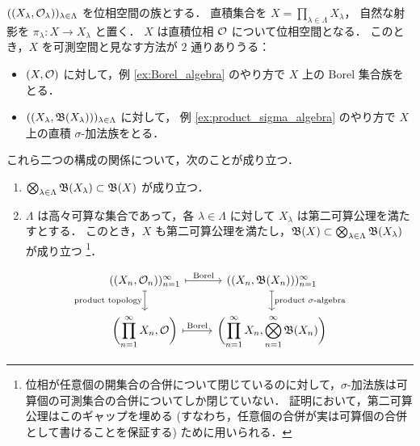 \begin{proposition}\label{prop:product_compatibility}
    $((X_\lambda,\mathcal{O}_\lambda))_{\lambda\in\Lambda}$ を位相空間の族とする．
    直積集合を $X=\prod_{\lambda\in\Lambda}X_\lambda$，
    自然な射影を $\pi_\lambda:X\to X_\lambda$ と置く．
    $X$ は直積位相 $\mathcal{O}$ について位相空間となる．
    このとき，$X$ を可測空間と見なす方法が $2$ 通りありうる：
    \begin{itemize}
        \item $(X,\mathcal{O})$ に対して，例 \ref{ex:Borel_algebra} のやり方で $X$ 上の Borel 集合族をとる．
        \item $((X_\lambda,\mathfrak{B}(X_\lambda)))_{\lambda\in\Lambda}$ に対して，
            例 \ref{ex:product_sigma_algebra} のやり方で $X$ 上の直積 $\sigma$-加法族をとる．
    \end{itemize}
    これら二つの構成の関係について，次のことが成り立つ．
    \begin{enumerate}
        \item $\bigotimes_{\lambda\in\Lambda}\mathfrak{B}(X_\lambda)\subset\mathfrak{B}(X)$ が成り立つ．
        \item $\Lambda$ は高々可算な集合であって，各 $\lambda\in\Lambda$ に対して $X_\lambda$ は第二可算公理を満たすとする．
            このとき，$X$ も第二可算公理を満たし，$\mathfrak{B}(X)\subset\bigotimes_{\lambda\in\Lambda}\mathfrak{B}(X_\lambda)$ が成り立つ
            \footnote{
                位相が任意個の開集合の合併について閉じているのに対して，$\sigma$-加法族は可算個の可測集合の合併についてしか閉じていない．
                証明において，第二可算公理はこのギャップを埋める (すなわち，任意個の合併が実は可算個の合併として書けることを保証する) ために用いられる．
            }．
    \end{enumerate}
    \begin{equation*}
        \begin{tikzcd}
            ((X_n,\Ocal_n))_{n=1}^\infty\arrow[r,mapsto,"\text{Borel}"]\arrow[d,mapsto,"\text{product topology}"']&
            ((X_n,\Bfrak(X_n)))_{n=1}^\infty\arrow[d,mapsto,"\text{product $\sigma$-algebra}"]\\
            \displaystyle\biggl(\prod_{n=1}^\infty X_n,\Ocal\biggr)\arrow[r,mapsto,"\text{Borel}"]&
            \displaystyle\biggl(\prod_{n=1}^\infty X_n,\bigotimes_{n=1}^\infty\Bfrak(X_n)\biggr)
        \end{tikzcd}
    \end{equation*}
\end{proposition}

